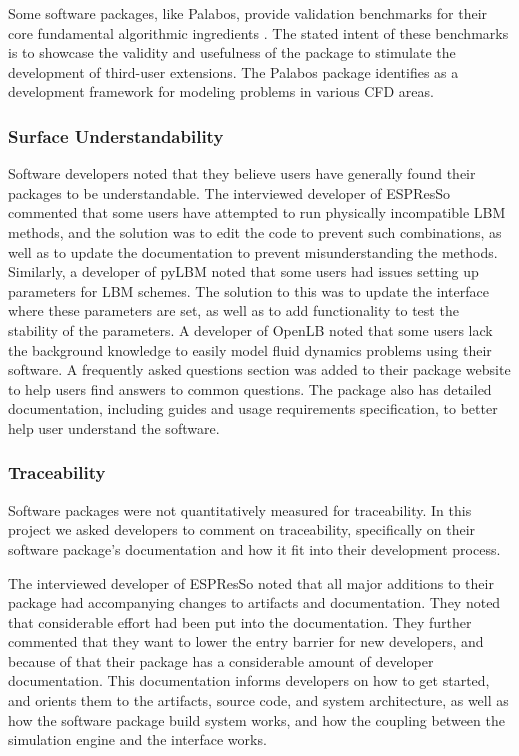 \documentclass[12pt, notitlepage]{article}
\begin{document}
Some software packages, like Palabos, provide validation benchmarks for their core fundamental algorithmic ingredients \citep{latt2021palabos}. The stated intent of these benchmarks is to showcase the validity and usefulness of the package to stimulate the development of third-user extensions. The Palabos package identifies as a development framework for modeling problems in various CFD areas. 

\subsubsection{Surface Understandability}

Software developers noted that they believe users have generally found their packages to be understandable. The interviewed developer of ESPResSo commented that some users have attempted to run physically incompatible LBM methods, and the solution was to edit the code to prevent such combinations, as well as to update the documentation to prevent misunderstanding the methods. Similarly, a developer of pyLBM noted that some users had issues setting up parameters for LBM schemes. The solution to this was to update the interface where these parameters are set, as well as to add functionality to test the stability of the parameters. A developer of OpenLB noted that some users lack the background knowledge to easily model fluid dynamics problems using their software. A frequently asked questions section was added to their package website to help users find answers to common questions. The package also has detailed documentation, including guides and usage requirements specification, to better help user understand the software.

\subsubsection{Traceability}

Software packages were not quantitatively measured for traceability.
In this project we asked developers to comment on traceability, specifically on their software package's documentation and how it fit into their development process. 

The interviewed developer of ESPResSo noted that all major additions to their package had accompanying changes to artifacts and documentation. They noted that considerable effort had been put into the documentation. They further commented that they want to lower the entry barrier for new developers, and because of that their package has a considerable amount of developer documentation. This documentation informs developers on how to get started, and orients them to the artifacts, source code, and system architecture, as well as how the software package build system works, and how the coupling between the simulation engine and the interface works. 
\end{document}
